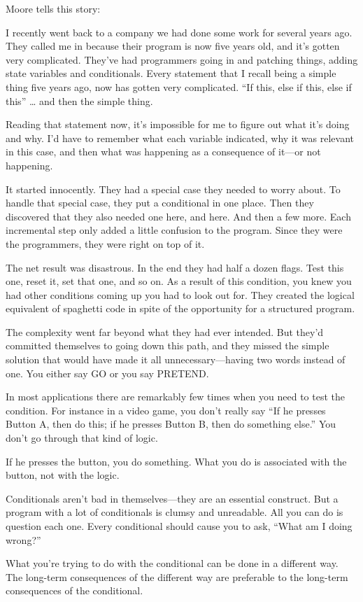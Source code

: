 \bigskip\blackline{2ex}\noindent
Moore tells this story:
\begin{tfquot}
I recently went back to a company we had done some work for several years
ago. They called me in because their program is now five years old, and it's
gotten very complicated. They've had programmers going in and patching
things, adding state variables and conditionals. Every statement that I
recall being a simple thing five years ago, now has gotten very complicated.
``If this, else if this, else if this'' \dots{} and then the simple thing.

Reading that statement now, it's impossible for me to figure out what it's
doing and why. I'd have to remember what each variable indicated, why it
was relevant in this case, and then what was happening as a consequence of
it---or not happening.

It started innocently. They had a special case they needed to worry about.
To handle that special case, they put a conditional in one place. Then they
discovered that they also needed one here, and here. And then a few more.
Each incremental step only added a little confusion to the program. Since
they were the programmers, they were right on top of it.

The net result was disastrous. In the end they had half a dozen flags. Test
this one, reset it, set that one, and so on. As a result of this condition, you
knew you had other conditions coming up you had to look out for. They
created the logical equivalent of spaghetti code in spite of the opportunity
for a structured program.

The complexity went far beyond what they had ever intended. But they'd
committed themselves to going down this path, and they missed the simple
solution that would have made it all unnecessary---having two words
instead of one. You either say GO or you say PRETEND.

In most applications there are remarkably few times when you need to test
the condition. For instance in a video game, you don't really say ``If he
presses Button A, then do this; if he presses Button B, then do something
else.'' You don't go through that kind of logic.

If he presses the button, you do something. What you do is associated with
the button, not with the logic.

Conditionals aren't bad in themselves---they are an essential construct. But
a program with a lot of conditionals is clumsy and unreadable. All you can
do is question each one. Every conditional should cause you to ask, ``What
am I doing wrong?''

What you're trying to do with the conditional can be done in a different
way. The long-term consequences of the different way are preferable to the
long-term consequences of the conditional.
\end{tfquot}
\blackline{1ex}

